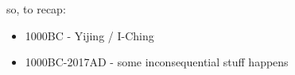 \documentclass{beamer}
\begin{document}
\begin{frame}[plain]
\end{frame}

\begin{frame}[plain]
\end{frame}



\begin{frame}{so, to recap:}
	\begin{itemize}
		\item 1000BC - Yijing / I-Ching
		\pause
		\item 1000BC-2017AD - some inconsequential stuff happens
	\end{itemize}
\end{frame}
\end{document}
